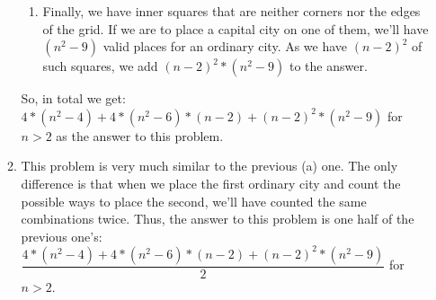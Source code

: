 \documentclass[12pt]{article}
\begin{document}
\begin{enumerate}
\begin{enumerate}
\begin{enumerate}
          \item Finally, we have inner squares that are neither corners nor the edges of the grid. If we are to place a capital city on one of them, we'll have $(n^2 - 9)$ valid places for an ordinary city. As we have $(n-2)^2$ of such squares, we add $(n-2)^2 * (n^2-9)$ to the answer.
        \end{enumerate}
        So, in total we get: \newline
        $4*(n^2-4) + 4*(n^2 - 6)*(n-2) + (n - 2)^2 * (n^2-9)$ for $n > 2$
        \newline as the answer to this problem.
      \item This problem is very much similar to the previous (a) one. The only difference is that when we place the first ordinary city and count the possible ways to place the second, we'll have counted the same combinations twice. Thus, the answer to this problem is one half of the previous one's: \newline
        $\dfrac{4*(n^2-4) + 4*(n^2 - 6)*(n-2) + (n - 2)^2 * (n^2-9)}{2}$ \newline 
        for $n > 2$.
    \end{enumerate}
\end{enumerate}
\end{document}
